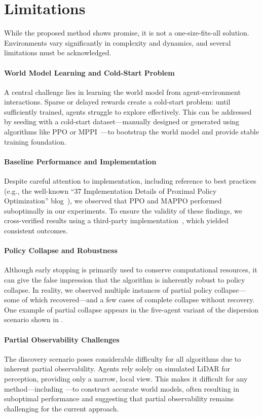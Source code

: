 \section{Limitations}

While the proposed method shows promise, it is not a one-size-fits-all solution. Environments vary significantly in complexity and dynamics, and several limitations must be acknowledged.

\paragraph{World Model Learning and Cold-Start Problem}
A central challenge lies in learning the world model from agent-environment interactions. Sparse or delayed rewards create a cold-start problem: until sufficiently trained, agents struggle to explore effectively. This can be addressed by seeding with a cold-start dataset---manually designed or generated using algorithms like PPO or MPPI~\cite{Alvarez24}---to bootstrap the world model and provide stable training foundation.

\paragraph{Baseline Performance and Implementation}
Despite careful attention to implementation, including reference to best practices (e.g., the well-known ``37 Implementation Details of Proximal Policy Optimization'' blog~\cite{Shengyi22}), we observed that PPO and MAPPO performed suboptimally in our experiments. To ensure the validity of these findings, we cross-verified results using a third-party implementation~\cite{Bettini24}, which yielded consistent outcomes.

\paragraph{Policy Collapse and Robustness}
Although early stopping is primarily used to conserve computational resources, it can give the false impression that the algorithm is inherently robust to policy collapse. In reality, we observed multiple instances of partial policy collapse---some of which recovered---and a few cases of complete collapse without recovery. One example of partial collapse appears in the five-agent variant of the dispersion scenario shown in .

\paragraph{Partial Observability Challenges}
The discovery scenario poses considerable difficulty for all algorithms due to inherent partial observability. Agents rely solely on simulated LiDAR for perception, providing only a narrow, local view. This makes it difficult for any method---including \fname{}---to construct accurate world models, often resulting in suboptimal performance and suggesting that partial observability remains challenging for the current approach.


